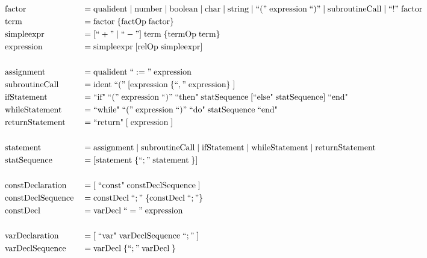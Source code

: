 \documentclass[12pt]{article}
\begin{document}
{\begin{align*}
    &\text{factor} &&= \text{qualident} \; | \; \text{number} \; | \; \text{boolean} \; | \; \text{char} \; | \; \text{string} \; | \; ``(" \; \text{expression} \; ``)" \; | \; \text{subroutineCall} \; | \; ``!" \; \text{factor} \\
    &\text{term} &&= \text{factor} \; \{ \text{factOp} \; \text{factor} \} \\
    &\text{simpleexpr} &&= [ ``+" \; | \; ``-" ] \; \text{term} \; \{ \text{termOp} \; \text{term} \} \\
    &\text{expression} &&= \text{simpleexpr} \; [ \text{relOp} \; \text{simpleexpr} ] \\ \\
    &\text{assignment} &&= \text{qualident} \; ``:=" \; \text{expression} \\
    &\text{subroutineCall} &&= \text{ident} \; ``(" \; [ \text{expression} \; \{ ``," \; \text{expression} \} \; ] \\
    &\text{ifStatement} &&= \text{``if"} \; ``(" \; \text{expression} \; ``)" \; \text{``then"} \; \text{statSequence} \; [\text{``else"} \; \text{statSequence}] \; \text{``end"} \\
    &\text{whileStatement} &&= \text{``while"} \; ``(" \; \text{expression} \; ``)" \; \text{``do"} \; \text{statSequence} \; \text{``end"} \\
    &\text{returnStatement} &&= \text{``return"} \; [ \; \text{expression} \; ] \\ \\
    &\text{statement} &&= \text{assignment} \; | \; \text{subroutineCall} \; | \; \text{ifStatement} \; | \; \text{whileStatement} \; | \; \text{returnStatement} \\ 
    &\text{statSequence} &&= [ \text{statement} \; \{ ``;" \; \text{statement} \; \} ] \\ \\
    &\text{constDeclaration} &&= [ \; \text{``const"} \; \text{constDeclSequence} \; ] \\
    &\text{constDeclSequence} &&= \text{constDecl} \; ``;" \; \{ \text{constDecl} \; ``;" \} \\
    &\text{constDecl} &&= \text{varDecl} \; ``=" \; \text{expression} \\ \\
    &\text{varDeclaration} &&= [ \; \text{``var"} \; \text{varDeclSequence} \; ``;" \; ] \\
    &\text{varDeclSequence} &&= \text{varDecl} \; \{ ``;" \; \text{varDecl} \; \} \\ \\

\end{align*}}
\end{document}
